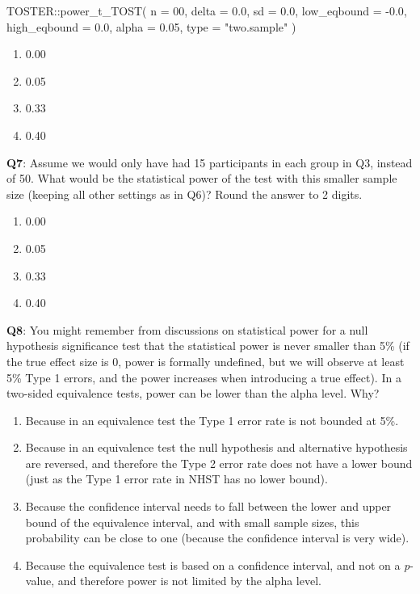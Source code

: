 \documentclass[
  oneside]{krantz}
\makeatletter
\newenvironment{Shaded}{\begin{snugshade}}{\end{snugshade}}
\newcommand{\AttributeTok}[1]{\textcolor[rgb]{0.61,0.61,0.61}{#1}}
\newcommand{\DecValTok}[1]{\textcolor[rgb]{0.06,0.06,0.06}{#1}}
\newcommand{\FloatTok}[1]{\textcolor[rgb]{0.06,0.06,0.06}{#1}}
\newcommand{\FunctionTok}[1]{\textcolor[rgb]{0,0,0}{#1}}
\newcommand{\NormalTok}[1]{#1}
\newcommand{\SpecialCharTok}[1]{\textcolor[rgb]{0,0,0}{#1}}
\newcommand{\StringTok}[1]{\textcolor[rgb]{0.5,0.5,0.5}{#1}}
\providecommand{\tightlist}{%
  \setlength{\itemsep}{0pt}\setlength{\parskip}{0pt}}
\newenvironment{kframe}{%
\medskip{}
\setlength{\fboxsep}{.8em}
 \def\at@end@of@kframe{}%
 \ifinner\ifhmode%
  \def\at@end@of@kframe{\end{minipage}}%
  \begin{minipage}{\columnwidth}%
 \fi\fi%
 \def\FrameCommand##1{\hskip\@totalleftmargin \hskip-\fboxsep
 \colorbox{shadecolor}{##1}\hskip-\fboxsep
     \hskip-\linewidth \hskip-\@totalleftmargin \hskip\columnwidth}%
 \MakeFramed {\advance\hsize-\width
   \@totalleftmargin\z@ \linewidth\hsize
   \@setminipage}}%
 {\par\unskip\endMakeFramed%
 \at@end@of@kframe}
\renewenvironment{Shaded}{\begin{kframe}}{\end{kframe}}
\makeatother
\begin{document}
\begin{Shaded}
\begin{Highlighting}[]
\NormalTok{TOSTER}\SpecialCharTok{::}\FunctionTok{power\_t\_TOST}\NormalTok{(}
  \AttributeTok{n =} \DecValTok{00}\NormalTok{,}
  \AttributeTok{delta =} \FloatTok{0.0}\NormalTok{,}
  \AttributeTok{sd =} \FloatTok{0.0}\NormalTok{,}
  \AttributeTok{low\_eqbound =} \SpecialCharTok{{-}}\FloatTok{0.0}\NormalTok{,}
  \AttributeTok{high\_eqbound =} \FloatTok{0.0}\NormalTok{,}
  \AttributeTok{alpha =} \FloatTok{0.05}\NormalTok{,}
  \AttributeTok{type =} \StringTok{"two.sample"}
\NormalTok{)}
\end{Highlighting}
\end{Shaded}

\begin{enumerate}
\def\labelenumi{\Alph{enumi})}
\tightlist
\item
  0.00
\item
  0.05
\item
  0.33
\item
  0.40
\end{enumerate}

\textbf{Q7}: Assume we would only have had 15 participants in each group in Q3, instead of 50. What would be the statistical power of the test with this smaller sample size (keeping all other settings as in Q6)? Round the answer to 2 digits.

\begin{enumerate}
\def\labelenumi{\Alph{enumi})}
\tightlist
\item
  0.00
\item
  0.05
\item
  0.33
\item
  0.40
\end{enumerate}

\textbf{Q8}: You might remember from discussions on statistical power for a null hypothesis significance test that the statistical power is never smaller than 5\% (if the true effect size is 0, power is formally undefined, but we will observe at least 5\% Type 1 errors, and the power increases when introducing a true effect). In a two-sided equivalence tests, power can be lower than the alpha level. Why?

\begin{enumerate}
\def\labelenumi{\Alph{enumi})}
\tightlist
\item
  Because in an equivalence test the Type 1 error rate is not bounded at 5\%.
\item
  Because in an equivalence test the null hypothesis and alternative hypothesis are reversed, and therefore the Type 2 error rate does not have a lower bound (just as the Type 1 error rate in NHST has no lower bound).
\item
  Because the confidence interval needs to fall between the lower and upper bound of the equivalence interval, and with small sample sizes, this probability can be close to one (because the confidence interval is very wide).
\item
  Because the equivalence test is based on a confidence interval, and not on a \emph{p}-value, and therefore power is not limited by the alpha level.
\end{enumerate}
\end{document}
